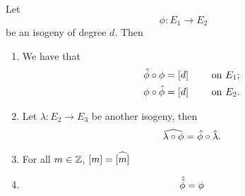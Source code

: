 
\begin{theorem}
	\label{thm:dual-isogeny-properties}
	Let
	\begin{equation*}
		\phi: E_1 \to E_2
	\end{equation*}
	be an isogeny of degree $d$. Then 
	\begin{enumerate}[label=(\alph*), itemsep=0em]
		\item We have that
			\begin{align*}
				\Hat\phi \circ \phi &= [d] \qquad \textrm { on } E_1;\\
				\phi \circ \Hat\phi &= [d] \qquad \textrm { on } E_2.
			\end{align*}
		\item Let $\lambda: E_2 \to E_3$ be another isogeny, then
			\begin{equation*}
				\widehat{\lambda\circ\phi} = \Hat\phi \circ \Hat\lambda.
			\end{equation*}
		\item For all $m \in \mathbb{Z}$, $[m] = \widehat{[m]}$
		\item 
			\begin{equation*}
				\Hat{\Hat{\phi}} = \phi
			\end{equation*}
	\end{enumerate}
\end{theorem}

